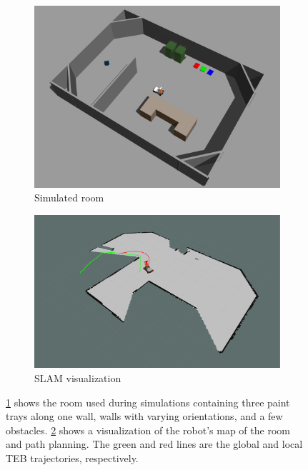 \begin{figure}
    \centering
    \begin{subfigure}{0.45\linewidth}
        \includegraphics[width=\linewidth]{images/sim_room.png}
        \caption{Simulated room}
        \label{fig:paintbot_room}
    \end{subfigure}
    \hfill
    \begin{subfigure}{0.45\linewidth}
        \includegraphics[width=\linewidth]{images/rviz_nav.png}
        \caption{SLAM visualization}
        \label{fig:paintbot_nav}
    \end{subfigure}
    \caption{\ref{fig:paintbot_room} shows the room used during simulations containing three paint trays along one wall, walls with varying orientations, and a few obstacles. \ref{fig:paintbot_nav} shows a visualization of the robot's map of the room and path planning. The green and red lines are the global and local TEB trajectories, respectively.}
    \label{fig:paintbot_runtime}
\end{figure}


